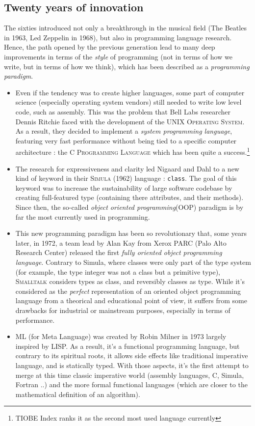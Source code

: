 \documentclass[a4paper]{article}
\begin{document}
\subsection{Twenty years of innovation}
The sixties introduced not only a breakthrough in the musical field (The Beatles in 1963, Led Zeppelin in 1968), but also in programming language research. Hence, the path opened by the previous generation lead to many deep improvements in terms of the \emph{style} of programming (not in terms of how we write, but in terms of how we think), which has been described as a \emph{programming paradigm}.
\begin{itemize}
\item
Even if the tendency was to create higher languages, some part of computer science (especially operating system vendors) still needed to write low level code, such as assembly. This was the problem that Bell Labs researcher Dennis Ritchie faced with the development of the \textsc{UNIX Operating System}. As a result, they decided to implement a \emph{system programming language}, featuring very fast performance without being tied to a specific computer architecture : the \textsc{C Programming Language} which has been quite a success.\footnote{TIOBE Index ranks it as the second most used language currently}
\item
The research for expressiveness and clarity led Nigaard and Dahl to a new kind of keyword in their \textsc{Simula} (1962) language : {\tt class}. The goal of this keyword was to increase the sustainability of large software codebase by creating full-featured type (containing there attributes, and their methods). Since then, the so-called \emph{object oriented programming}(OOP) paradigm is by far the most currently used in programming.
\item
This new programming paradigm has been so revolutionary that, some years later, in 1972, a team lead by Alan Kay from Xerox PARC (Palo Alto Research Center) released the first \emph{fully oriented object programming language}. Contrary to Simula, where classes were only part of the type system (for example, the type integer was not a class but a primitive type), \textsc{Smalltalk} considers types as class, and reversibly classes as type. While it's considered as the \emph{perfect} representation of an oriented object programming language from a theorical and educational point of view, it suffers from some drawbacks for industrial or mainstream purposes, especially in terms of performance.
\item
\textsc{ML} (for Meta Language) was created by Robin Milner in 1973 largely inspired by LISP. As a result, it's a functional programming language, but contrary to its spiritual roots, it allows side effects like traditional imperative language, and is statically typed. With those aspects, it's the first attempt to merge at this time classic imperative world (assembly languages, C, Simula, Fortran ..) and the more formal functional languages (which are closer to the mathematical definition of an algorithm).
\end{itemize}
\end{document}
